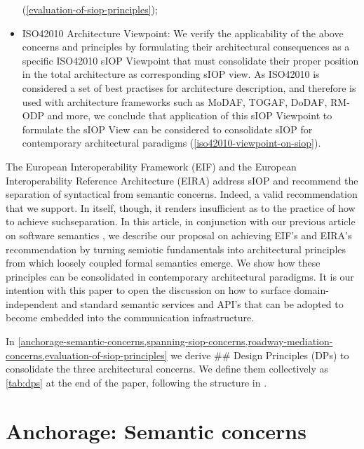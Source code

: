 \documentclass[sort&compress,preprint,authoryear,3p,twocolumn]{elsarticle}
\begin{document}
\begin{itemize}
  (\cref{evaluation-of-siop-principles});
\item
  ISO42010 Architecture Viewpoint: We verify the applicability of the
  above concerns and principles by formulating their architectural
  consequences as a specific ISO42010 sIOP Viewpoint that must
  consolidate their proper position in the total architecture as
  corresponding sIOP view. As ISO42010 is considered a set of best
  practises for architecture description, and therefore is used with
  architecture frameworks such as MoDAF, TOGAF, DoDAF, RM-ODP and more,
  we conclude that application of this sIOP Viewpoint to formulate the
  sIOP View can be considered to consolidate sIOP for contemporary
  architectural paradigms (\cref{iso42010-viewpoint-on-siop}).
\end{itemize}

The European Interoperability Framework
(EIF)\citep{EuropeanCommissionDGInformatics-ISA2Programme2017} and the
European Interoperability Reference Architecture (EIRA)
\citep{EuropeanCommissionDGInformatics-ISA2Programme2019} address sIOP
and recommend the separation of syntactical from semantic concerns.
Indeed, a valid recommendation that we support. In itself, though, it
renders insufficient as to the practice of how to achieve
suchseparation. In this article, in conjunction with our previous
article on software semantics \citep{Brandt2021a}, we describe our
proposal on achieving EIF's and EIRA's recommendation by turning
semiotic fundamentals into architectural principles from which loosely
coupled formal semantics emerge. We show how these principles can be
consolidated in contemporary architectural paradigms. It is our
intention with this paper to open the discussion on how to surface
domain-independent and standard semantic services and API's that can be
adopted to become embedded into the communication infrastructure.

In
\cref{anchorage-semantic-concerns,spanning-siop-concerns,roadway-mediation-concerns,evaluation-of-siop-principles}
we derive \#\# Design Principles (DPs) to consolidate the three
architectural concerns. We define them collectively as \cref{tab:dps} at
the end of the paper, following the structure in \citep{Greefhorst2011}.

\hypertarget{anchorage-semantic-concerns}{%
\section{Anchorage: Semantic
concerns}\label{anchorage-semantic-concerns}}
\end{document}
